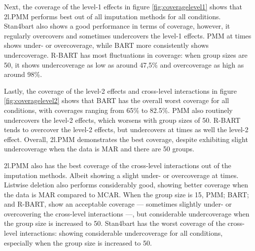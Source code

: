 \documentclass[10pt, a4paper, titlepage]{article}
\begin{document}
Next, the coverage of the level-1 effects in figure \ref{fig:coveragelevel1} shows that 2l.PMM performs best out of all imputation methods for all conditions. Stan4bart also shows a good performance in terms of coverage, however, it regularly overcovers and sometimes undercovers the level-1 effects. PMM at times shows under- or overcoverage, while BART more consistently shows undercoverage. R-BART has most fluctuations in coverage: when group sizes are 50, it shows undercoverage as low as around 47,5\% and overcoverage as high as around 98\%.


Lastly, the coverage of the level-2 effects and cross-level interactions in figure \ref{fig:coveragelevel2} shows that BART has the overall worst coverage for all conditions, with coverages ranging from 65\% to 82.5\%. PMM also routinely undercovers the level-2 effects, which worsens with group sizes of 50. R-BART tends to overcover the level-2 effects, but undercovers at times as well the level-2 effect. Overall, 2l.PMM demonstrates the best coverage, despite exhibiting slight undercoverage when the data is MAR and there are 50 groups. 

2l.PMM also has the best coverage of the cross-level interactions out of the imputation methods. Albeit showing a slight under- or overcoverage at times. Listwise deletion also performs considerably good, showing better coverage when the data is MAR compared to MCAR. When the group size is 15, PMM; BART; and R-BART, show an acceptable coverage --- sometimes slightly under- or overcovering the cross-level interactions ---, but considerable undercoverage when the group size is increased to 50. Stan4bart has the worst coverage of the cross-level interactions: showing considerable undercoverage for all conditions, especially when the group size is increased to 50.
\end{document}
